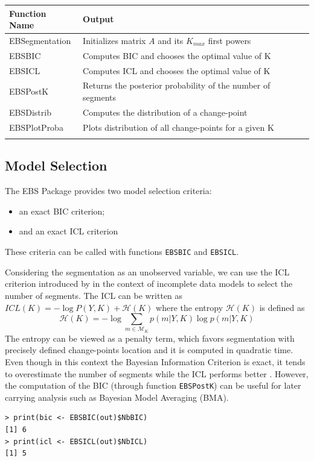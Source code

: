 \documentclass{bioinfo}
\begin{document}
\begin{methods}
\begin{table}[!t]
{\begin{tabular}{ll}\toprule
Function Name & Output \\\midrule
 EBSegmentation & Initializes matrix $A$ and its $K_{max}$ first powers\\
 EBSBIC & Computes BIC and chooses the optimal value of K \\
 EBSICL & Computes ICL and chooses the optimal value of K \\
 EBSPostK & Returns the posterior probability of the number of segments\\
 EBSDistrib & Computes the distribution of a change-point\\
 EBSPlotProba & Plots distribution of all change-points for a given K\\\botrule
\end{tabular}}{}
\end{table}




\subsection{Model Selection}

The EBS Package provides two model selection criteria:
\begin{itemize}
\item an exact BIC criterion;
\item and an exact ICL criterion
\end{itemize}
These criteria can be called with functions \texttt{EBSBIC} and
\texttt{EBSICL}.

Considering the segmentation as an unobserved variable, we can use the ICL criterion introduced by \cite{biernacki_assessingmixture_2000} in the context of incomplete data models to select the number of segments. 
The ICL can be written as $ICL(K) = -\log P(Y,K) + \mathcal{H}(K) \label{ICL}$ where
the entropy $\mathcal{H}(K)$ is defined as
\begin{equation}
  \mathcal{H}(K)=-\log \sum_{m\in \mathcal{M}_K} p(m|Y,K) \log p(m|Y,K)
\end{equation}
The entropy can be viewed as a penalty term, which favors
  segmentation with precisely defined change-points location and it
is computed in quadratic time.  Even though in this context the
Bayesian Information Criterion is exact, it tends to
overestimate the number of segments while the ICL performs
better \citep{rigaill_exact_2011}. However, the computation of the BIC
(through function \texttt{EBSPostK}) can be useful for later carrying
analysis such as Bayesian Model Averaging (BMA).
\begin{verbatim}
> print(bic <- EBSBIC(out)$NbBIC)
[1] 6
> print(icl <- EBSICL(out)$NbICL)
[1] 5


\end{verbatim}
\end{methods}
\end{document}
